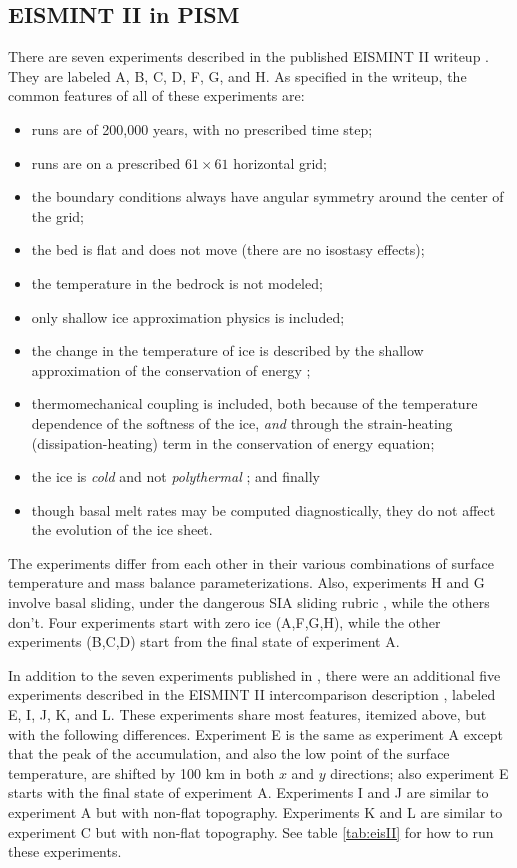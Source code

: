 \documentclass[11pt,final]{amsart}
\begin{document}
\subsection{EISMINT II in PISM}\label{subsect:EISMINTII}  There are seven experiments described in the published EISMINT II writeup \cite{EISMINT00}.  They are labeled A, B, C, D, F, G, and H.  As specified in the writeup, the common features of all of these experiments are:\begin{itemize}
\item runs are of 200,000 years, with no prescribed time step;
\item runs are on a prescribed $61\times 61$ horizontal grid;
\item the boundary conditions always have angular symmetry around the center of the grid;
\item the bed is flat and does not move (there are no isostasy effects);
\item the temperature in the bedrock is not modeled;
\item only shallow ice approximation physics is included;
\item the change in the temperature of ice is described by the shallow approximation of the conservation of energy \cite{Fowler};
\item thermomechanical coupling is included, both because of the temperature dependence of the softness of the ice, \emph{and} through the strain-heating (dissipation-heating) term in the conservation of energy equation;
\item the ice is \emph{cold} and not \emph{polythermal} \cite{Greve}; and finally
\item though basal melt rates may be computed diagnostically, they do not affect the evolution of the ice sheet.
\end{itemize}
The experiments differ from each other in their various combinations of surface temperature and mass balance parameterizations.  Also, experiments H and G involve basal sliding, under the dangerous SIA sliding rubric \cite[Appendix B]{BBssasliding}, while the others don't.  Four experiments start with zero ice (A,F,G,H), while the other experiments (B,C,D) start from the final state of experiment A.

In addition to the seven experiments published in \cite{EISMINT00}, there were an additional five experiments described in the EISMINT II intercomparison description 
\cite{EISIIdescribe}, labeled E, I, J, K, and L.  These experiments share most features, itemized above, but with the following differences.  Experiment E is the same as experiment A except that the peak of the accumulation, and also the low point of the surface temperature, are shifted by 100 km in both $x$ and $y$ directions; also experiment E starts with the final state of experiment A.  Experiments I and J are similar to experiment A but with non-flat topography.  Experiments K and L are similar to experiment C but with non-flat topography.  See table \ref{tab:eisII} for how to run these experiments.
\end{document}
